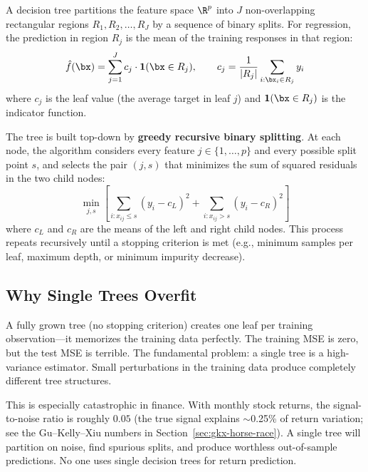 \begin{definition}
A decision tree partitions the feature space $\R^p$ into $J$ non-overlapping rectangular regions $R_1, R_2, \ldots, R_J$ by a sequence of binary splits.
For regression, the prediction in region $R_j$ is the mean of the training responses in that region:
\begin{equation}
\hat{f}(\bx) = \sum_{j=1}^J c_j \cdot \mathbf{1}(\bx \in R_j), \qquad c_j = \frac{1}{|R_j|} \sum_{i: \bx_i \in R_j} y_i
\label{eq:cart-prediction}
\end{equation}
where $c_j$ is the leaf value (the average target in leaf $j$) and $\mathbf{1}(\bx \in R_j)$ is the indicator function.
\end{definition}

The tree is built top-down by \textbf{greedy recursive binary splitting}.
At each node, the algorithm considers every feature $j \in \{1, \ldots, p\}$ and every possible split point $s$, and selects the pair $(j, s)$ that minimizes the sum of squared residuals in the two child nodes:
\begin{equation}
\min_{j, s} \left[ \sum_{i: x_{ij} \leq s} (y_i - c_L)^2 + \sum_{i: x_{ij} > s} (y_i - c_R)^2 \right]
\label{eq:cart-split}
\end{equation}
where $c_L$ and $c_R$ are the means of the left and right child nodes.
This process repeats recursively until a stopping criterion is met (e.g., minimum samples per leaf, maximum depth, or minimum impurity decrease).

\subsection{Why Single Trees Overfit}

A fully grown tree (no stopping criterion) creates one leaf per training observation---it memorizes the training data perfectly.
The training MSE is zero, but the test MSE is terrible.
The fundamental problem: a single tree is a high-variance estimator.
Small perturbations in the training data produce completely different tree structures.

This is especially catastrophic in finance.
With monthly stock returns, the signal-to-noise ratio is roughly $0.05$ (the true signal explains $\sim$0.25\% of return variation; see the Gu--Kelly--Xiu numbers in Section~\ref{sec:gkx-horse-race}).
A single tree will partition on noise, find spurious splits, and produce worthless out-of-sample predictions.
No one uses single decision trees for return prediction.

